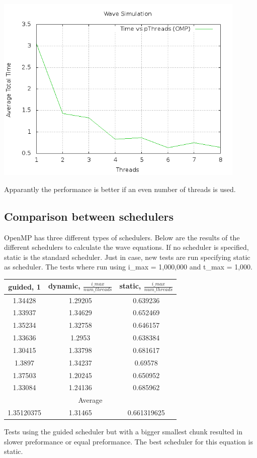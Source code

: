 \documentclass[a4paper]{article}
\begin{document}
    \begin{center}
      \includegraphics[width=0.9\textwidth]{speedplotsolo.png}
    \end{center}
    Apparantly the performance is better if an even number of threads is used.
  \newpage
  \subsection{Comparison between schedulers}
    OpenMP has three different types of schedulers.
    Below are the results of the different
    schedulers to calculate the wave equations. 
    If no scheduler is specified, static is the standard scheduler.
    Just in case, new tests are run specifying static as scheduler.
    The tests where run using i\_max = 1,000,000 and t\_max = 1,000.\\
    \begin{center}
      \begin{tabular}{| c | c | c |}
      \hline
      guided, 1 & dynamic, $\frac{i\_max}{num\_threads}$ & static, $\frac{i\_max}{num\_threads}$\\
      \hline
      1.34428 & 1.29205 & 0.639236\\
      \hline
      1.33937 & 1.34629 & 0.652469\\
      \hline
      1.35234 & 1.32758 & 0.646157\\
      \hline
      1.33636 & 1.2953 & 0.638384\\
      \hline
      1.30415 & 1.33798 & 0.681617\\
      \hline
      1.3897 & 1.34237 & 0.69578\\
      \hline
      1.37503 & 1.20245 & 0.650952\\
      \hline
      1.33084 & 1.24136 & 0.685962\\
      \hline
      \multicolumn{3}{|c|}{Average}\\
      \hline
      1.35120375 & 1.31465 & 0.661319625\\
      \hline
      \end{tabular}
    \end{center}
    Tests using the guided scheduler but with a bigger smallest chunk resulted
    in slower preformance or equal preformance. The best scheduler for this equation
    is static.
    
\end{document}
